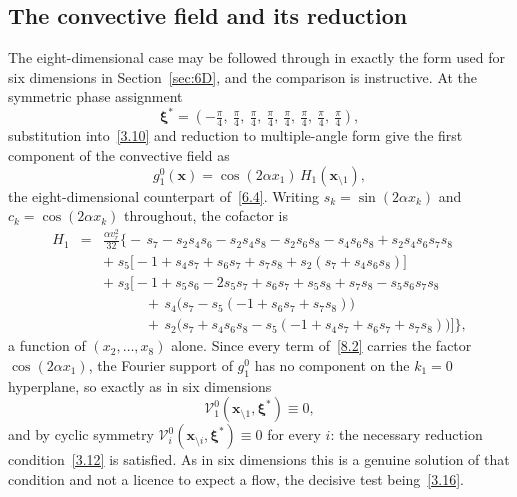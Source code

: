 \documentclass[11pt]{jfm}
\numberwithin{equation}{section}
\begin{document}
\subsection{The convective field and its reduction}
The eight-dimensional case may be followed through in exactly the form used for six dimensions
in Section~\ref{sec:6D}, and the comparison is instructive. At the symmetric phase assignment
\[
\boldsymbol{\xi}^{\ast}
=\left(-\tfrac{\pi}{4},\ \tfrac{\pi}{4},\ \tfrac{\pi}{4},\ \tfrac{\pi}{4},\ \tfrac{\pi}{4},\ \tfrac{\pi}{4},\ \tfrac{\pi}{4},\ \tfrac{\pi}{4}\right),
\]
substitution into~\eqref{3.10} and reduction to multiple-angle form give the first component of the
convective field as
\begin{equation}
\label{8.2}
g_1^0(\boldsymbol{x}) = \cos(2\alpha x_1)\,H_1(\boldsymbol{x}_{\setminus 1}),
\end{equation}
the eight-dimensional counterpart of~\eqref{6.4}. Writing $s_k=\sin(2\alpha x_k)$ and
$c_k=\cos(2\alpha x_k)$ throughout,
the cofactor is
\begin{eqnarray}
\label{8.3}
H_1 &=& \frac{\alpha v_r^2}{32}\Big\{-\,s_7 - s_2s_4s_6 - s_2s_4s_8 - s_2s_6s_8 - s_4s_6s_8 + s_2s_4s_6s_7s_8\nonumber\\
&&+\;s_5\Big[-1 + s_4s_7 + s_6s_7 + s_7s_8 + s_2\left(s_7 + s_4s_6s_8\right)\Big]\nonumber\\
&&+\;s_3\Big[-1 + s_5s_6 - 2s_5s_7 + s_6s_7 + s_5s_8 + s_7s_8 - s_5s_6s_7s_8\nonumber\\
&&\qquad\quad +\,s_4\big(s_7 - s_5(-1 + s_6s_7 + s_7s_8)\big)\nonumber\\
&&\qquad\quad +\,s_2\big(s_7 + s_4s_6s_8 - s_5(-1 + s_4s_7 + s_6s_7 + s_7s_8)\big)\Big]\Big\},
\end{eqnarray}
a function of $(x_2,\dots,x_8)$ alone. Since every term of~\eqref{8.2} carries the factor
$\cos(2\alpha x_1)$, the Fourier support of $g_1^0$ has no component on the $k_1=0$ hyperplane, so
exactly as in six dimensions
\begin{equation}
\label{8.4}
\mathcal{V}_1^0(\boldsymbol{x}_{\setminus 1}, \boldsymbol{\xi}^{\ast}) \equiv 0,
\end{equation}
and by cyclic symmetry $\mathcal{V}_i^0(\boldsymbol{x}_{\setminus i},\boldsymbol{\xi}^{\ast})\equiv0$ for every $i$: the necessary reduction
condition~\eqref{3.12} is satisfied. As in six dimensions this is a genuine solution of that
condition and not a licence to expect a flow, the decisive test being~\eqref{3.16}.
\end{document}
